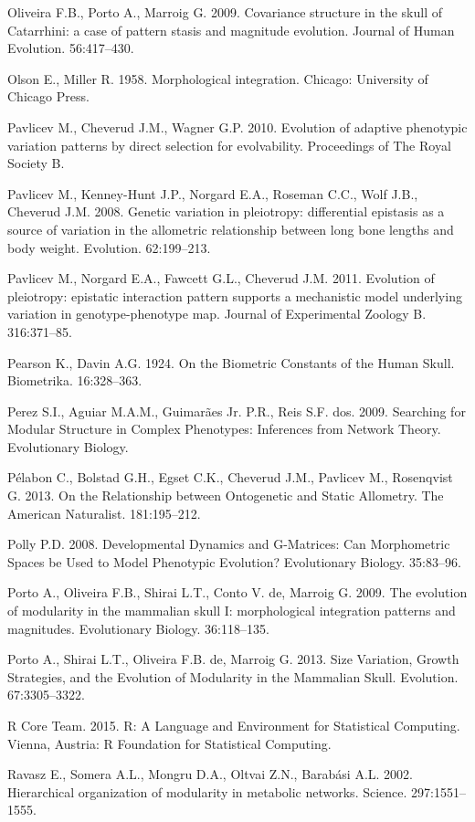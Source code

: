 \documentclass[12pt,]{article}
\begin{document}
Oliveira F.B., Porto A., Marroig G. 2009. Covariance structure in the
skull of Catarrhini: a case of pattern stasis and magnitude evolution.
Journal of Human Evolution. 56:417--430.

Olson E., Miller R. 1958. Morphological integration. Chicago: University
of Chicago Press.

Pavlicev M., Cheverud J.M., Wagner G.P. 2010. Evolution of adaptive
phenotypic variation patterns by direct selection for evolvability.
Proceedings of The Royal Society B.

Pavlicev M., Kenney-Hunt J.P., Norgard E.A., Roseman C.C., Wolf J.B.,
Cheverud J.M. 2008. Genetic variation in pleiotropy: differential
epistasis as a source of variation in the allometric relationship
between long bone lengths and body weight. Evolution. 62:199--213.

Pavlicev M., Norgard E.A., Fawcett G.L., Cheverud J.M. 2011. Evolution
of pleiotropy: epistatic interaction pattern supports a mechanistic
model underlying variation in genotype-phenotype map. Journal of
Experimental Zoology B. 316:371--85.

Pearson K., Davin A.G. 1924. On the Biometric Constants of the Human
Skull. Biometrika. 16:328--363.

Perez S.I., Aguiar M.A.M., Guimarães Jr. P.R., Reis S.F. dos. 2009.
Searching for Modular Structure in Complex Phenotypes: Inferences from
Network Theory. Evolutionary Biology.

Pélabon C., Bolstad G.H., Egset C.K., Cheverud J.M., Pavlicev M.,
Rosenqvist G. 2013. On the Relationship between Ontogenetic and Static
Allometry. The American Naturalist. 181:195--212.

Polly P.D. 2008. Developmental Dynamics and G-Matrices: Can Morphometric
Spaces be Used to Model Phenotypic Evolution? Evolutionary Biology.
35:83--96.

Porto A., Oliveira F.B., Shirai L.T., Conto V. de, Marroig G. 2009. The
evolution of modularity in the mammalian skull I: morphological
integration patterns and magnitudes. Evolutionary Biology. 36:118--135.

Porto A., Shirai L.T., Oliveira F.B. de, Marroig G. 2013. Size
Variation, Growth Strategies, and the Evolution of Modularity in the
Mammalian Skull. Evolution. 67:3305--3322.

R Core Team. 2015. R: A Language and Environment for Statistical
Computing. Vienna, Austria: R Foundation for Statistical Computing.

Ravasz E., Somera A.L., Mongru D.A., Oltvai Z.N., Barabási A.L. 2002.
Hierarchical organization of modularity in metabolic networks. Science.
297:1551--1555.
\end{document}
